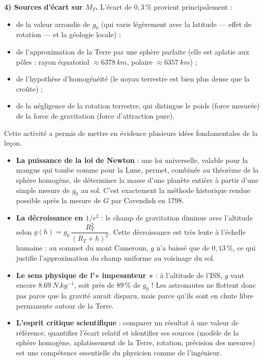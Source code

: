 \documentclass[11pt]{article}
\newcommand{\cle}[1]{{\popxbold\color{popdark}#1}}
\newcounter{popsec}
\newcounter{popsub}
\newcommand{\courssub}[1]{%
  \stepcounter{popsub}%
  \par\vspace{9pt}\noindent{\popxbold\fontsize{11.5}{13}\selectfont\color{popink}{\color{poporange}\thepopsec.\thepopsub}\hspace{6pt}#1}\par\nopagebreak\vspace{4pt}
}
\begin{document}
\begin{exoresolu}
\textbf{4) Sources d'écart sur $M_T$.} L'écart de $0{,}3\,\%$ provient principalement :
\begin{itemize}
\item de la valeur arrondie de $g_0$ (qui varie légèrement avec la latitude — effet de rotation — et la géologie locale) ;
\item de l'approximation de la Terre par une sphère parfaite (elle est aplatie aux pôles : rayon équatorial $\approx \SI{6378}{km}$, polaire $\approx \SI{6357}{km}$) ;
\item de l'hypothèse d'homogénéité (le noyau terrestre est bien plus dense que la croûte) ;
\item de la négligence de la rotation terrestre, qui distingue le poids (force mesurée) de la force de gravitation (force d'attraction pure).
\end{itemize}
\end{exoresolu}

\courssub{Bilan de l'activité}

Cette activité a permis de mettre en évidence plusieurs idées fondamentales de la leçon.

\begin{itemize}
\item \textbf{La puissance de la loi de Newton} : une loi universelle, valable pour la mangue qui tombe comme pour la Lune, permet, combinée au théorème de la sphère homogène, de déterminer la masse d'une planète entière à partir d'une simple mesure de $g_0$ au sol. C'est exactement la méthode historique rendue possible après la mesure de $G$ par Cavendish en 1798.
\item \textbf{La décroissance en $1/r^2$} : le champ de gravitation diminue avec l'altitude selon $g(h) = g_0\,\dfrac{R_T^2}{(R_T+h)^2}$. Cette décroissance est très lente à l'échelle humaine : au sommet du mont Cameroun, $g$ n'a baissé que de $0{,}13\,\%$, ce qui justifie l'approximation du \cle{champ uniforme} au voisinage du sol.
\item \textbf{Le sens physique de l'« impesanteur »} : à l'altitude de l'ISS, $g$ vaut encore $\SI{8,69}{N.kg^{-1}}$, soit près de $89\,\%$ de $g_0$ ! Les astronautes ne flottent donc pas parce que la gravité aurait disparu, mais parce qu'ils sont en chute libre permanente autour de la Terre.
\item \textbf{L'esprit critique scientifique} : comparer un résultat à une valeur de référence, quantifier l'écart relatif et identifier ses sources (modèle de la sphère homogène, aplatissement de la Terre, rotation, précision des mesures) est une compétence essentielle du physicien comme de l'ingénieur.
\end{itemize}
\end{document}
